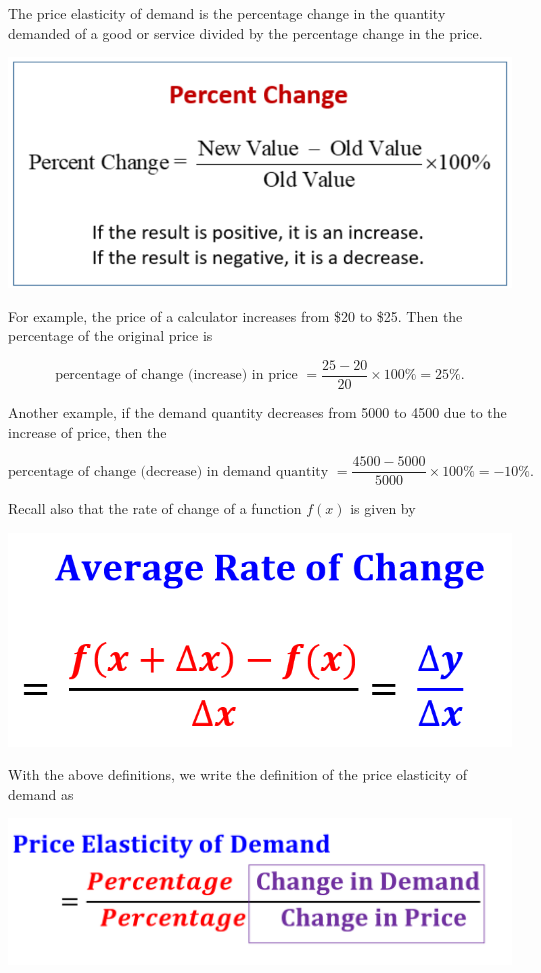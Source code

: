 \documentclass[
]{book}
\begin{document}
The price elasticity of demand is the percentage change in the quantity demanded of a good or service divided by the percentage change in the price.

\begin{center}\includegraphics[width=0.7\linewidth]{img10/w10-PercentageChange} \end{center}

For example, the price of a calculator increases from \$20 to \$25. Then the percentage of the original price is

\[
\text{percentage of change (increase) in price } = \frac{25-20}{20}\times 100\% =25\%. 
\]

Another example, if the demand quantity decreases from 5000 to 4500 due to the increase of price, then the

\[
\text{percentage of change (decrease) in demand quantity } = \frac{4500-5000}{5000}\times 100\% = -10\%. 
\]

Recall also that the rate of change of a function \(f(x)\) is given by

\begin{center}\includegraphics[width=0.5\linewidth]{img10/w10-RateofChange} \end{center}

With the above definitions, we write the definition of the price elasticity of demand as

\begin{center}\includegraphics[width=0.7\linewidth]{img10/w10-elasticityDemand} \end{center}
\end{document}
